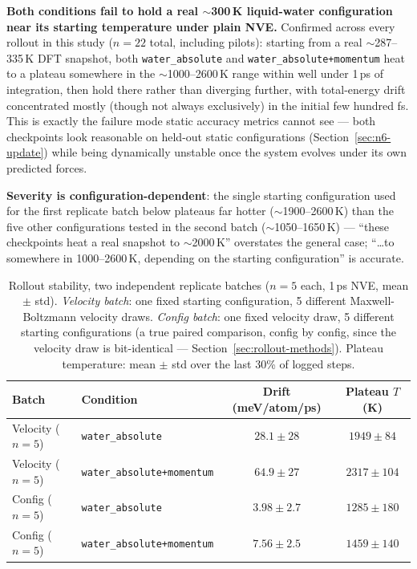 \documentclass[11pt]{article}
\begin{document}
\textbf{Both conditions fail to hold a real $\sim$300\,K liquid-water
configuration near its starting temperature under plain NVE.} Confirmed
across every rollout in this study ($n=22$ total, including pilots): starting
from a real $\sim$287--335\,K DFT snapshot, both \texttt{water\_absolute} and
\texttt{water\_absolute+momentum} heat to a plateau somewhere in the
$\sim$1000--2600\,K range within well under 1\,ps of integration, then hold
there rather than diverging further, with total-energy drift concentrated
mostly (though not always exclusively) in the initial few hundred fs. This is
exactly the failure mode static accuracy metrics cannot see
\cite{mlip-validation} --- both checkpoints look reasonable on held-out
static configurations (Section~\ref{sec:n6-update}) while being dynamically
unstable once the system evolves under its own predicted forces.

\textbf{Severity is configuration-dependent}: the single starting
configuration used for the first replicate batch below plateaus far hotter
($\sim$1900--2600\,K) than the five other configurations tested in the
second batch ($\sim$1050--1650\,K) --- ``these checkpoints heat a real
snapshot to $\sim$2000\,K'' overstates the general case;
``\ldots to somewhere in 1000--2600\,K, depending on the starting
configuration'' is accurate.

\begin{table}[h]
\centering
\caption{Rollout stability, two independent replicate batches ($n=5$ each,
1\,ps NVE, mean $\pm$ std). \emph{Velocity batch}: one fixed starting
configuration, 5 different Maxwell-Boltzmann velocity draws. \emph{Config
batch}: one fixed velocity draw, 5 different starting configurations (a true
paired comparison, config by config, since the velocity draw is
bit-identical --- Section~\ref{sec:rollout-methods}). Plateau temperature:
mean $\pm$ std over the last 30\% of logged steps.}
\label{tab:rollout-summary}
\begin{tabular}{llcc}
\toprule
Batch & Condition & Drift (meV/atom/ps) & Plateau $T$ (K) \\
\midrule
Velocity ($n=5$) & \texttt{water\_absolute}          & $28.1 \pm 28$  & $1949 \pm 84$ \\
Velocity ($n=5$) & \texttt{water\_absolute+momentum} & $64.9 \pm 27$  & $2317 \pm 104$ \\
Config ($n=5$)   & \texttt{water\_absolute}          & $3.98 \pm 2.7$ & $1285 \pm 180$ \\
Config ($n=5$)   & \texttt{water\_absolute+momentum} & $7.56 \pm 2.5$ & $1459 \pm 140$ \\
\bottomrule
\end{tabular}
\end{table}
\end{document}
